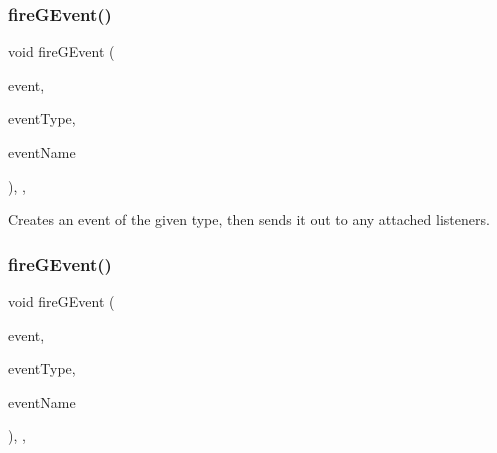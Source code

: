 \mbox{\label{classsgl_1_1GObservable_a741345310d9b7c5170a6cbc410c44ac4}} 
\subsubsection{\texorpdfstring{fire\+G\+Event()}{fireGEvent()}\hspace{0.1cm}{\footnotesize\ttfamily [6/8]}}
{\footnotesize\ttfamily void fire\+G\+Event (\begin{DoxyParamCaption}\item[{Q\+Timer\+Event $\ast$}]{event,  }\item[{\mbox{\hyperlink{namespacesgl_a2628ea8d12e8b2563c32f05dc7fff6fa}{Event\+Type}}}]{event\+Type,  }\item[{const std\+::string \&}]{event\+Name }\end{DoxyParamCaption})\hspace{0.3cm}{\ttfamily [protected]}, {\ttfamily [virtual]}, {\ttfamily [inherited]}}



Creates an event of the given type, then sends it out to any attached listeners. 

\mbox{\label{classsgl_1_1GObservable_a93bf338968a0338761b8e4dc62f582e9}} 
\subsubsection{\texorpdfstring{fire\+G\+Event()}{fireGEvent()}\hspace{0.1cm}{\footnotesize\ttfamily [7/8]}}
{\footnotesize\ttfamily void fire\+G\+Event (\begin{DoxyParamCaption}\item[{Q\+Wheel\+Event $\ast$}]{event,  }\item[{\mbox{\hyperlink{namespacesgl_a2628ea8d12e8b2563c32f05dc7fff6fa}{Event\+Type}}}]{event\+Type,  }\item[{const std\+::string \&}]{event\+Name }\end{DoxyParamCaption})\hspace{0.3cm}{\ttfamily [protected]}, {\ttfamily [virtual]}, {\ttfamily [inherited]}}



